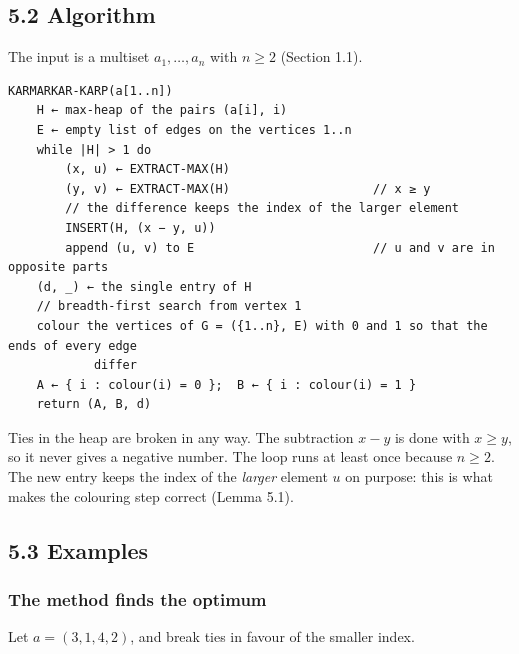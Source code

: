 \documentclass[
]{article}
\begin{document}
\hypertarget{algorithm-3}{%
\subsection{5.2 Algorithm}\label{algorithm-3}}

The input is a multiset \(a_1, \dots, a_n\) with \(n \ge 2\) (Section
1.1).

\begin{verbatim}
KARMARKAR-KARP(a[1..n])
    H ← max-heap of the pairs (a[i], i)
    E ← empty list of edges on the vertices 1..n
    while |H| > 1 do
        (x, u) ← EXTRACT-MAX(H)
        (y, v) ← EXTRACT-MAX(H)                    // x ≥ y
        // the difference keeps the index of the larger element
        INSERT(H, (x − y, u))
        append (u, v) to E                         // u and v are in opposite parts
    (d, _) ← the single entry of H
    // breadth-first search from vertex 1
    colour the vertices of G = ({1..n}, E) with 0 and 1 so that the ends of every edge
            differ
    A ← { i : colour(i) = 0 };  B ← { i : colour(i) = 1 }
    return (A, B, d)
\end{verbatim}

Ties in the heap are broken in any way. The subtraction \(x - y\) is
done with \(x \ge y\), so it never gives a negative number. The loop
runs at least once because \(n \ge 2\). The new entry keeps the index of
the \emph{larger} element \(u\) on purpose: this is what makes the
colouring step correct (Lemma 5.1).

\hypertarget{examples-2}{%
\subsection{5.3 Examples}\label{examples-2}}

\hypertarget{the-method-finds-the-optimum}{%
\subsubsection{The method finds the
optimum}\label{the-method-finds-the-optimum}}

Let \(a = (3, 1, 4, 2)\), and break ties in favour of the smaller index.
\end{document}
